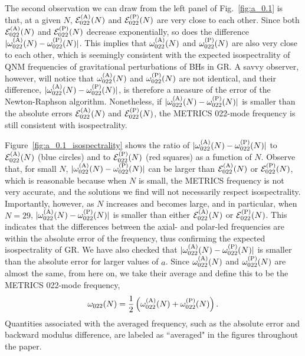 \documentclass[aps,prx,amsmath,floats,floatfix,twocolumn,
  superscriptaddress,nofootinbib,showpacs]{revtex4-1}
\begin{document}
The second observation we can draw from the left panel of Fig.~\ref{fig:a_0.1} is that, at a given $N$, $\mathcal{E}^{\rm(A)}_{022}(N) $ and $\mathcal{E}^{\rm(P)}_{022}(N) $ are very close to each other. 
Since both  $\mathcal{E}^{\rm(A)}_{022}(N) $ and $\mathcal{E}^{\rm(P)}_{022}(N) $ decrease exponentially, so does the difference $|\omega^{\rm(A)}_{022}(N)-\omega^{\rm(P)}_{022}(N)|$.
This implies that $\omega^{\rm(A)}_{022}(N) $ and $\omega^{\rm(P)}_{022}(N) $ are also very close to each other, which is seemingly consistent with the expected isospectrality of QNM frequencies of gravitational perturbations of BHs in GR. 
A savvy observer, however, will notice that $\omega^{\rm(A)}_{022}(N) $ and $\omega^{\rm(P)}_{022}(N) $ are not identical, and their difference,  $|\omega^{\rm(A)}_{022}(N) - \omega^{\rm(P)}_{022}(N)|$, is therefore a measure of the error of the Newton-Raphson algorithm.
Nonetheless, if $|\omega^{\rm(A)}_{022}(N) - \omega^{\rm(P)}_{022}(N)|$ is smaller than the absolute errors $\mathcal{E}^{\rm(A)}_{022}(N)$ and $\mathcal{E}^{\rm(P)}_{022}(N)$, the METRICS 022-mode frequency is still consistent with isospectrality. 

Figure~\ref{fig:a_0.1_isospectrality} shows the ratio of $|\omega^{\rm(A)}_{022}(N) - \omega^{\rm(P)}_{022}(N)|$ to $\mathcal{E}^{\rm(A)}_{022}(N)$ (blue circles) and to $\mathcal{E}^{\rm(P)}_{022}(N)$ (red squares) as a function of $N$. 
Observe that, for small $N$, $|\omega^{\rm(A)}_{022}(N) - \omega^{\rm(P)}_{022}(N)|$ can be larger than $\mathcal{E}^{\rm(A)}_{022}(N)$ or $\mathcal{E}^{\rm(P)}_{022}(N)$, which is reasonable because when $N$ is small, the METRICS frequency is not very accurate, and the solutions we find will not necessarily respect isospectrality. 
Importantly, however, as $N$ increases and becomes large, and in particular, when $N=29$, $|\omega^{\rm(A)}_{022}(N) - \omega^{\rm(P)}_{022}(N)|$ is smaller than either $\mathcal{E}^{\rm(A)}_{022}(N)$ or $\mathcal{E}^{\rm(P)}_{022}(N)$. This indicates that the differences between the axial- and polar-led frequencies are within the absolute error of the frequency, thus confirming the expected isospectrality of GR. 
We have also checked that $|\omega^{\rm(A)}_{022}(N) - \omega^{\rm(P)}_{022}(N)|$ is smaller than the absolute error for larger values of $a$. 
Since $\omega^{\rm(A)}_{022}(N) $ and $\omega^{\rm(P)}_{022}(N) $ are almost the same, from here on, we take their average and define this to be the METRICS 022-mode frequency, 
\begin{equation}
\omega_{022} (N) = \frac{1}{2} \left( \omega^{\rm(A)}_{022}(N) + \omega^{\rm(P)}_{022}(N)\right). 
\end{equation}
Quantities associated with the averaged frequency, such as the absolute error and backward modulus difference, are labeled as ``averaged" in the figures throughout the paper. 
\end{document}
